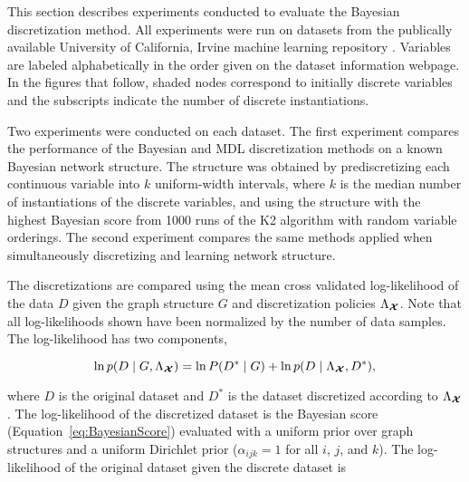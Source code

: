 This section describes experiments conducted to evaluate the Bayesian discretization method.
All experiments were run on datasets from the publically available University of California, Irvine machine learning repository \citep{Lichman_2013}.
Variables are labeled alphabetically in the order given on the dataset information webpage.
In the figures that follow, shaded nodes correspond to initially discrete variables and the subscripts indicate the number of discrete instantiations.

Two experiments were conducted on each dataset.
The first experiment compares the performance of the Bayesian and MDL discretization methods on a known Bayesian network structure.
The structure was obtained by prediscretizing each continuous variable into $k$ uniform-width intervals, where $k$ is the median number of instantiations of the discrete variables, and using the structure with the highest Bayesian score from \num{1000} runs of the K2 algorithm with random variable orderings.
The second experiment compares the same methods applied when simultaneously discretizing and learning network structure.

The discretizations are compared using the mean cross validated log-likelihood of the data $D$ given the graph structure $G$ and discretization policies $\Lambda_{\bm{\mathcal{X}}}$.
Note that all log-likelihoods shown have been normalized by the number of data samples.
The log-likelihood has two components,

\begin{equation}
\ln p(D\mid G, \Lambda_{\bm{\mathcal{X}}}) = \ln P(D^*\mid G) + \ln p(D\mid \Lambda_{\bm{\mathcal{X}}}, D^*)\text{,}
\end{equation}

\noindent
where $D$ is the original dataset and $D^*$ is the dataset discretized according to $\Lambda_{\bm{\mathcal{X}}}$.
The log-likelihood of the discretized dataset is the Bayesian score (Equation~\ref{eq:BayesianScore}) evaluated with a uniform prior over graph structures and a uniform Dirichlet prior ($\alpha_{ijk} = 1$ for all $i$, $j$, and $k$).
The log-likelihood of the original dataset given the discrete dataset is


